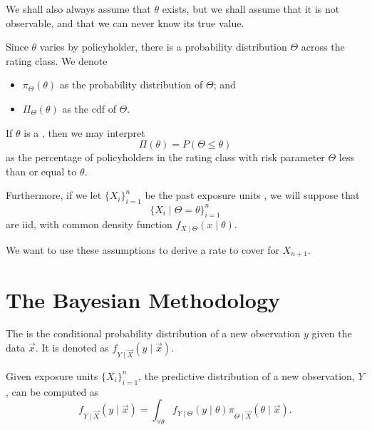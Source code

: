 \documentclass[notoc,notitlepage]{tufte-book}
\begin{document}
\begin{note}[Assumptions]
  We shall also always assume that $\theta$ exists, but we shall assume that it
  is not observable, and that we can never know its true value.
  
  Since $\theta$ varies by policyholder, there is a probability distribution
  $\Theta$ across the rating class. We denote
  \begin{itemize}
    \item $\pi_{\Theta}(\theta)$ as the probability distribution of $\Theta$; and
    \item $\Pi_{\Theta}(\theta)$ as the cdf of $\Theta$.
  \end{itemize}
  If $\theta$ is a  ,
  then we may interpret
  \begin{equation*}
    \Pi(\theta) = P(\Theta \leq \theta)
  \end{equation*}
  as the percentage of policyholders in the rating class with risk parameter
  $\Theta$ less than or equal to $\theta$.

  Furthermore, if we let $\{ X_i \}_{i=1}^n$ be the past exposure units
  , we will suppose that
  \begin{equation*}
    \{ X_i \mid \Theta = \theta \}_{i=1}^n
  \end{equation*}
  are iid, with common density function $f_{X \mid \Theta}(x \mid \theta)$.
\end{note}

We want to use these assumptions to derive a rate to cover for $X_{n+1}$.

\section{The Bayesian Methodology}%
\label{sec:the_bayesian_methodology}

\begin{defn}\label{defn:predictive_distribution}
  The  is the conditional probability
  distribution of a new observation $y$ given the data $\vec{x}$. It is denoted
  as $f_{Y \mid \vec{X}}(y \mid \vec{x})$.
\end{defn}

\begin{propo}\label{propo:formula_for_predictive_distribution}
  Given exposure units $\{ X_i \}_{i=1}^n$, the predictive distribution of a new
  observation, $Y$, can be computed as
  \begin{equation*}
    f_{Y \mid \vec{X}}(y \mid \vec{x}) = \int_{\forall \theta} f_{Y \mid
    \Theta}(y \mid \theta) \pi_{\Theta \mid \vec{X}}(\theta \mid \vec{x}).
  \end{equation*}
\end{propo}
\end{document}
